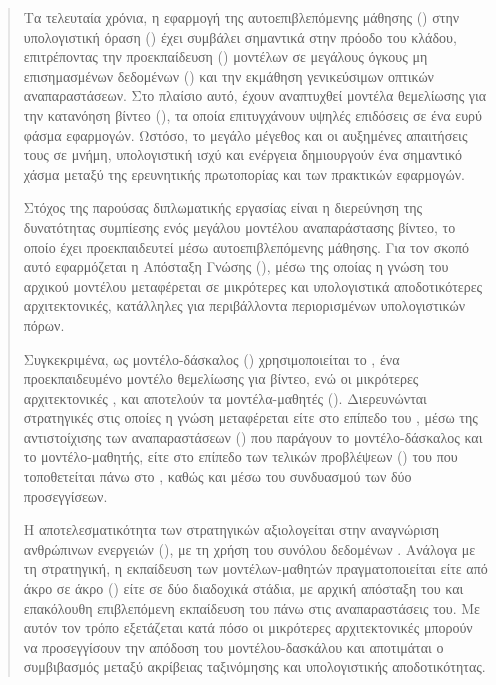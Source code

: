 \begin{abstract}
Τα τελευταία χρόνια, η εφαρμογή της αυτοεπιβλεπόμενης μάθησης
() στην υπολογιστική όραση
() έχει συμβάλει σημαντικά στην πρόοδο του κλάδου, επιτρέποντας την
προεκπαίδευση () μοντέλων σε μεγάλους όγκους μη επισημασμένων δεδομένων () και
την εκμάθηση γενικεύσιμων οπτικών αναπαραστάσεων. Στο πλαίσιο αυτό, έχουν
αναπτυχθεί μοντέλα θεμελίωσης για την κατανόηση βίντεο (), τα οποία
επιτυγχάνουν υψηλές επιδόσεις σε ένα ευρύ φάσμα εφαρμογών. Ωστόσο, το μεγάλο
μέγεθος και οι αυξημένες απαιτήσεις τους σε μνήμη, υπολογιστική ισχύ και
ενέργεια δημιουργούν ένα σημαντικό χάσμα μεταξύ της ερευνητικής πρωτοπορίας και των πρακτικών
εφαρμογών.

Στόχος της παρούσας διπλωματικής εργασίας είναι η διερεύνηση της δυνατότητας
συμπίεσης ενός μεγάλου μοντέλου αναπαράστασης βίντεο, το οποίο έχει
προεκπαιδευτεί μέσω αυτοεπιβλεπόμενης μάθησης. Για τον σκοπό αυτό
εφαρμόζεται η Απόσταξη Γνώσης (), μέσω της
οποίας η γνώση του αρχικού μοντέλου μεταφέρεται σε μικρότερες και
υπολογιστικά αποδοτικότερες αρχιτεκτονικές, κατάλληλες για περιβάλλοντα
περιορισμένων υπολογιστικών πόρων.

Συγκεκριμένα, ως μοντέλο-δάσκαλος () χρησιμοποιείται το
, ένα προεκπαιδευμένο μοντέλο θεμελίωσης για βίντεο,
ενώ οι μικρότερες αρχιτεκτονικές ,  και
 αποτελούν τα μοντέλα-μαθητές (). Διερευνώνται στρατηγικές στις οποίες η γνώση μεταφέρεται
είτε στο επίπεδο του , μέσω της αντιστοίχισης των
αναπαραστάσεων () που παράγουν το μοντέλο-δάσκαλος και το
μοντέλο-μαθητής, είτε στο επίπεδο των τελικών προβλέψεων
() του  που τοποθετείται πάνω στο
, καθώς και μέσω του συνδυασμού των δύο προσεγγίσεων.

Η αποτελεσματικότητα των στρατηγικών αξιολογείται στην αναγνώριση
ανθρώπινων ενεργειών (), με τη χρήση του συνόλου δεδομένων .
Ανάλογα με τη στρατηγική, η εκπαίδευση των μοντέλων-μαθητών πραγματοποιείται είτε από άκρο
σε άκρο () είτε σε δύο διαδοχικά στάδια, με αρχική
απόσταξη του  και επακόλουθη επιβλεπόμενη εκπαίδευση του
 πάνω στις αναπαραστάσεις του. Με αυτόν τον τρόπο εξετάζεται κατά πόσο οι
μικρότερες αρχιτεκτονικές μπορούν να προσεγγίσουν την απόδοση του
μοντέλου-δασκάλου και αποτιμάται ο συμβιβασμός μεταξύ ακρίβειας
ταξινόμησης και υπολογιστικής αποδοτικότητας.


\end{abstract}
